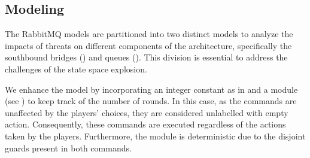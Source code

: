 
\subsection{Modeling}
\label{prop:validation}

The RabbitMQ models are partitioned into two distinct models to analyze the impacts of threats on different components of the architecture, specifically the southbound bridges () and queues (). This division is essential to address the challenges of the state space explosion.



We enhance the model by incorporating an integer constant as in \cite{KNPS19} and a module (see ) to keep track of the number of rounds. In this case, as the commands are unaffected by the players' choices, they are considered unlabelled with empty action. Consequently, these commands are executed regardless of the actions taken by the players. Furthermore, the module is deterministic due to the disjoint guards present in both commands.

